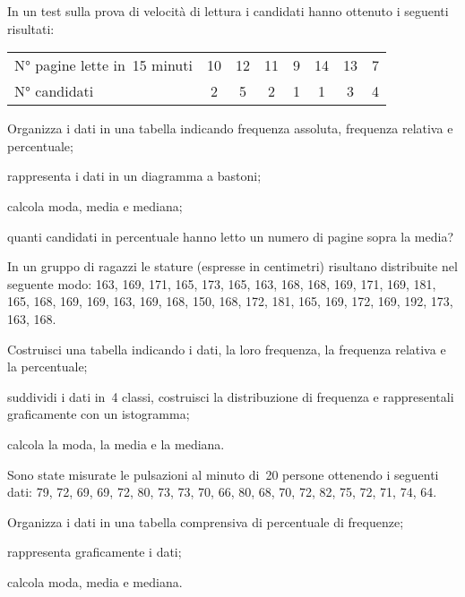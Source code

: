 \begin{esercizio}
\label{ese:A.40}
In un test sulla prova di velocità di lettura i candidati hanno ottenuto i 
seguenti risultati:
\begin{center}
 \begin{tabularx}{.7\textwidth}{X*{7}{c}}
\toprule
N° pagine lette in~15 minuti & 10 & 12 & 11 & 9 & 14 & 13 & 7 \\
N° candidati & 2 & 5 & 2 & 1 & 1 & 3 & 4 \\
\bottomrule
\end{tabularx}
\end{center}
\begin{enumeratea}
 \item Organizza i dati in una tabella indicando frequenza assoluta, 
frequenza relativa e percentuale;
 \item rappresenta i dati in un diagramma a bastoni;
 \item calcola moda, media e mediana;
 \item quanti candidati in percentuale hanno letto un numero di pagine 
sopra la media?
\end{enumeratea}
\end{esercizio}

\begin{esercizio}
\label{ese:A.41}
In un gruppo di ragazzi le stature (espresse in centimetri) risultano 
distribuite nel seguente modo:
163, 169, 171, 165, 173, 165, 163, 168,
168, 169, 171, 169, 181, 165, 168, 169,
169, 163, 169, 168, 150, 168, 172, 181,
165, 169, 172, 169, 192, 173, 163, 168.

\begin{enumeratea}
 \item Costruisci una tabella indicando i dati, la loro frequenza, la 
frequenza relativa e la percentuale;
 \item suddividi i dati in~4 classi, costruisci la distribuzione di 
frequenza e rappresentali graficamente con un istogramma;
 \item calcola la moda, la media e la mediana.
\end{enumeratea}
\end{esercizio}

\begin{esercizio}
\label{ese:A.42}
Sono state misurate le pulsazioni al minuto di~20 persone ottenendo i 
seguenti dati:
79, 72, 69, 69, 72, 80, 73, 73, 70, 66,
80, 68, 70, 72, 82, 75, 72, 71, 74, 64.

\begin{enumeratea}
 \item Organizza i dati in una tabella comprensiva di percentuale di 
frequenze;
 \item rappresenta graficamente i dati;
 \item calcola moda, media e mediana.
\end{enumeratea}
\end{esercizio}

